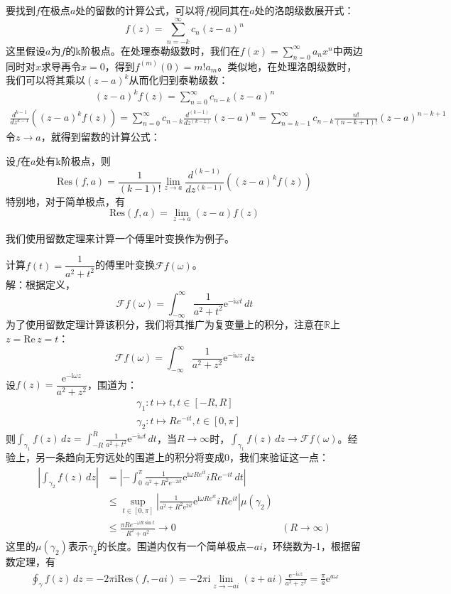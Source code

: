 \documentclass{ctexbook}
\begin{document}
要找到$f$在极点$a$处的留数的计算公式，可以将$f$视同其在$a$处的洛朗级数展开式：
\[f(z)=\sum_{n=-k}^{\infty}c_n(z-a)^n\]
这里假设$a$为$f$的k阶极点。在处理泰勒级数时，我们在$f(x)=\sum_{n=0}^{\infty}a_n x^n$中两边同时对$x$求导再令$x=0$，得到$f^{(m)}(0)=m!a_m$。类似地，在处理洛朗级数时，我们可以将其乘以$(z-a)^k$从而化归到泰勒级数：
\begin{align*}
    (z-a)^k f(z)=\sum_{n=0}^{\infty}c_{n-k}(z-a)^n
\end{align*}
\begin{align*}
    \frac{d^{k-1}}{dz^{k-1}}((z-a)^k f(z))=\sum_{n=0}^{\infty}c_{n-k}\frac{d^{(k-1)}}{dz^{(k-1)}}(z-a)^n=\sum_{n=k-1}^{\infty}c_{n-k}\frac{n!}{(n-k+1)!}(z-a)^{n-k+1}
\end{align*}
令$z\to a$，就得到留数的计算公式：\begin{proposition}
    设$f$在$a$处有k阶极点，则
    \[\text{Res}(f,a)=\frac{1}{(k-1)!}\lim_{z\to a}\frac{d^{(k-1)}}{dz^{(k-1)}}((z-a)^k f(z))\]
    特别地，对于简单极点，有
    \[\text{Res}(f,a)=\lim_{z\to a}(z-a)f(z)\]
\end{proposition}

我们使用留数定理来计算一个傅里叶变换作为例子。
\begin{example}
    计算$f(t)=\dfrac{1}{a^2+t^2}$的傅里叶变换$\mathcal{F} f(\omega)$。\\
    解：根据定义，$$\mathcal{F} f(\omega)=\int_{-\infty}^{\infty}\dfrac{1}{a^2+t^2}\mathrm{e}^{-\mathrm{i}\omega t}\,dt$$
    为了使用留数定理计算该积分，我们将其推广为复变量上的积分，注意在$\mathbb{R}$上$z=\text{Re}\,z=t$：
    \[\mathcal{F} f(\omega)=\int_{-\infty}^{\infty}\frac{1}{a^2+z^2}\mathrm{e}^{-\mathrm{i}\omega z}\,dz\]
    设$f(z)=\dfrac{\mathrm{e}^{-\mathrm{i}\omega z}}{a^2+z^2}$，围道为：\begin{align*}
        &\gamma_1:t\mapsto t,t\in[-R,R]\\
        &\gamma_2:t\mapsto Re^{-it},t\in[0,\pi]
    \end{align*}
    则$\int_{\gamma_1}f(z)\,dz=\int_{-R}^{R}\frac{1}{a^2+t^2}\mathrm{e}^{-\mathrm{i}\omega t}\,dt$，当$R\to\infty$时，$\int_{\gamma_1}f(z)\,dz\to \mathcal{F} f(\omega)$。经验上，另一条趋向无穷远处的围道上的积分将变成0，我们来验证这一点：\begin{align*}
        \left|\int_{\gamma_2}f(z)\,dz\right|&=\left|-\int_0^{\pi}\frac{1}{a^2+R^2\mathrm{e}^{-2it}}\mathrm{e}^{\mathrm{i}\omega Re^{it}}iRe^{-it}\,dt\right|\\
        &\leq \sup_{t\in[0,\pi]}\left|\frac{1}{a^2+R^2\mathrm{e}^{2it}}\mathrm{e}^{\mathrm{i}\omega Re^{it}}iRe^{it}\right|\mu(\gamma_2)\\
        &\leq \frac{\pi Re^{-\omega R\sin t}}{R^2+a^2}\to 0&(R\to\infty)
    \end{align*}
    这里的$\mu(\gamma_2)$表示$\gamma_2$的长度。围道内仅有一个简单极点$-ai$，环绕数为-1，根据留数定理，有
    \begin{align*}
        \oint_{\gamma}f(z)\,dz=-2\pi \mathrm{i}\text{Res}(f,-ai)=-2\pi \mathrm{i}\lim_{z\to -ai}(z+ai)\frac{\mathrm{e}^{-\mathrm{i}\omega z}}{a^2+z^2}=\frac{\pi}{a}\mathrm{e}^{a\omega}
    \end{align*}
\end{example}
\end{document}
